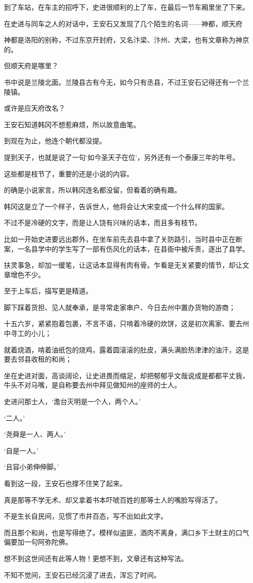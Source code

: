到了车站，在车主的招呼下，史进很顺利的上了车，在最后一节车厢里坐了下来。

在史进与同车之人的对话中，王安石又发现了几个陌生的名词——神都，顺天府

神都是洛阳的别称，不过东京开封府，又名汴梁、汴州、大梁，也有文章称为神京的。

但顺天府是哪里？

书中说是兰陵北面。兰陵县古有今无，如今只有丞县，不过王安石记得还有一个兰陵镇。

或许是应天府改名？

王安石知道韩冈不想惹麻烦，所以故意曲笔。

到现在为止，他连个朝代都没提。

提到天子，也就是说了一句‘如今圣天子在位’，另外还有一个泰康三年的年号。

这些都是枝节了，重要的还是小说的内容。

的确是小说家言，所以韩冈连名都没留，但看着的确有趣。

韩冈这是立了一个样子，告诉世人，他将会让大宋变成一个什么样的国家。

不过不是冷硬的文字，而是让人饶有兴味的话本，而且多有枝节。

比如一开始史进要远出郡外，在坐车前先去县中拿了关防路引，当时县中正在断案，一名县学中的学生写了一部有伤风化的话本，在县衙中被斥责，逐出了县学。

扶灵事急，却加一缓笔，让这话本显得有肉有骨。乍看是无关紧要的情节，却让文章增色不少。

至于上车后，描写更是精道。

脚下踩着货担、见人就奉承，是寻常走家串户、今日去州中置办货物的游商；

十五六岁，紧紧抱着包裹，不言不语，只啃着冷硬的炊饼，这是初次离家、要去州中寻工的小儿；

就着烧酒，啃着油纸包的烧鸡，露着圆滚滚的肚皮，满头满脸热津津的油汗，这是要去邻县收租的和尚；

坐在史进对面，高谈阔论，让史进畏而缩足，却把郁郁乎文哉说成是都都平丈我，牛头不对马嘴，是自称要去州中拜见做知州的座师的士人。

史进问那士人，‘澹台灭明是一个人，两个人。’

‘二人。’

‘尧舜是一人、两人。’

‘自是一人。’

‘且容小弟伸伸脚。’

看到这一段，王安石也撑不住笑了起来。

真是那等不学无术、却又拿着书本吓唬百姓的那等士人的嘴脸写得活了。

不是生长自民间，见惯了市井百态，写不出如此文字。

而且那个和尚，也是写得绝了。模样似盗匪，酒肉不离身，满口乡下土财主的口气偏要加一句阿弥陀佛。

想不到这世间还有此等人物！更想不到，文章还有这种写法。

不知不觉间，王安石已经沉浸了进去，浑忘了时间。

